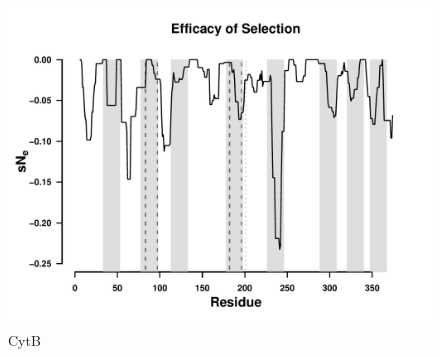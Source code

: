 \documentclass[12pt]{article}
\begin{document}
\begin{figure}[H]
     \centering
	\includegraphics[width=\textwidth]{img/sNe_slide_whale}
	\caption{CytB}
	\label{fig:sne_whale}
\end{figure}
\end{document}
